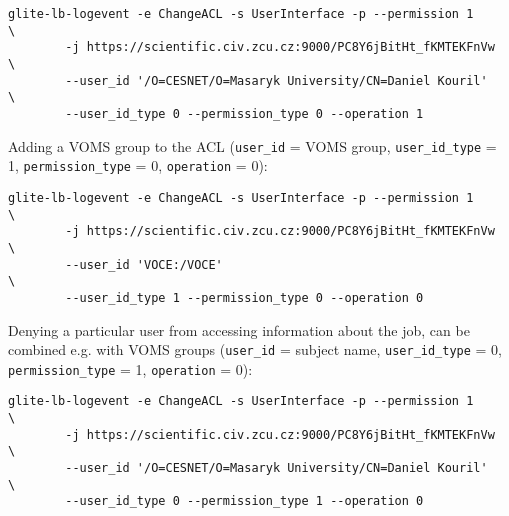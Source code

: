 \begin{verbatim}
glite-lb-logevent -e ChangeACL -s UserInterface -p --permission 1          \
        -j https://scientific.civ.zcu.cz:9000/PC8Y6jBitHt_fKMTEKFnVw    \
        --user_id '/O=CESNET/O=Masaryk University/CN=Daniel Kouril'     \
        --user_id_type 0 --permission_type 0 --operation 1
\end{verbatim}

Adding a VOMS group to the ACL (\verb'user_id' = VOMS group,
\verb'user_id_type' = 1,  \verb'permission_type' = 0, \verb'operation' = 0):

\begin{verbatim}
glite-lb-logevent -e ChangeACL -s UserInterface -p --permission 1          \
        -j https://scientific.civ.zcu.cz:9000/PC8Y6jBitHt_fKMTEKFnVw    \
        --user_id 'VOCE:/VOCE'                                          \
        --user_id_type 1 --permission_type 0 --operation 0
\end{verbatim}

Denying a particular user from accessing information about the job, can be
combined e.g. with VOMS groups (\verb'user_id' = subject name,
\verb'user_id_type' = 0, \verb'permission_type' = 1, \verb'operation' = 0):

\begin{verbatim}
glite-lb-logevent -e ChangeACL -s UserInterface -p --permission 1          \
        -j https://scientific.civ.zcu.cz:9000/PC8Y6jBitHt_fKMTEKFnVw    \
        --user_id '/O=CESNET/O=Masaryk University/CN=Daniel Kouril'     \
        --user_id_type 0 --permission_type 1 --operation 0
\end{verbatim}

